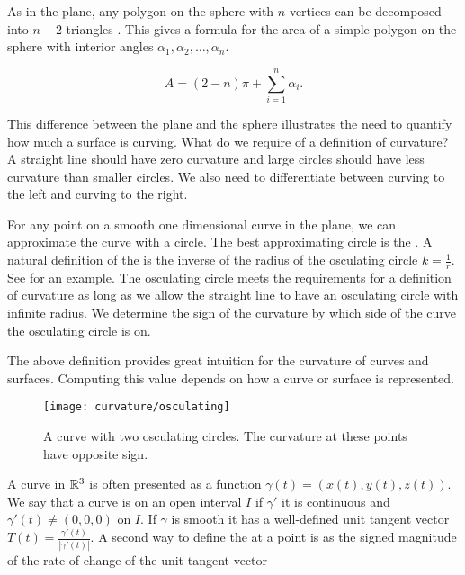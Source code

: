 As in the plane, any polygon on the sphere with $n$ vertices can be decomposed
into $n-2$ triangles \cite{orourke_computational_1994}. This gives a formula for the area of a simple polygon
on the sphere with interior angles $\alpha_1,\alpha_2,\ldots, \alpha_n$.

\begin{equation} \label{eqn:sphere-area}
	A=(2-n)\pi +\sum_{i=1}^n \alpha_i.
\end{equation}




This difference between the plane and the sphere illustrates
the need to quantify how much a surface is curving.
What  do we require of a definition of curvature?
A straight line should have zero curvature and
 large circles should have less curvature than smaller circles.
We also need to differentiate between
curving to the left and curving to the right.

For any point on a smooth one dimensional curve in the plane,
we can approximate the curve with a circle.
The best approximating circle is the  .
A natural definition of the  is the inverse of the radius of the osculating
 circle $k=\frac{1}{r}$.
See  for an example.
The osculating circle meets the requirements for a definition of curvature as long
as we allow the straight line to have an osculating circle with infinite radius.
We determine the sign of the curvature by which side of the curve the osculating circle is on.




The above definition provides great intuition for the curvature of curves
and surfaces.
Computing this value depends on how a curve or surface is represented. 

\begin{figure}[htb]
	\centering
	\texttt{[image: curvature/osculating]}
	\caption{A curve with two osculating circles. The curvature at these points
	have opposite sign.}
	\label{fig:osculating-circle}
\end{figure}

A curve in $\mathbb{R}^3$ is often presented as a function
$\gamma(t)=(x(t),y(t),z(t))$. We say that a curve is  on an open interval $I$
if $\gamma'$ it is continuous and $\gamma'(t)\neq (0,0,0)$ on $I$. 
If $\gamma$ is smooth it has a well-defined unit tangent vector $T(t)=\frac{\gamma'(t)}{|\gamma'(t)|}.$
A second way to define the   at a point is as the signed magnitude of the rate of change of the 
unit tangent vector

